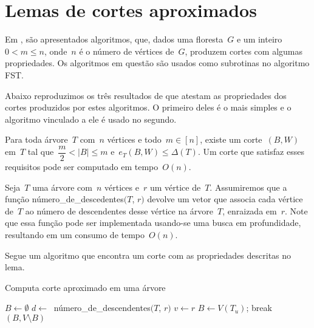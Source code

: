 \section {Lemas de cortes aproximados}

Em \cite{Schmidt15}, são apresentados 
algoritmos, que, dados uma floresta~$G$ e um 
inteiro~$0<m\le n$, onde~$n$ é o número de vértices de~$G$, 
produzem cortes com algumas propriedades.
Os algoritmos em questão são usados como subrotinas no algoritmo
FST.

Abaixo reproduzimos os três resultados de \cite{Schmidt15} que 
atestam as propriedades dos cortes produzidos por estes algoritmos.
O primeiro deles é o mais simples e o algoritmo vinculado a ele
é usado no segundo.

\bigskip

\begin{lem}[]
\label{lema:simpleApproxCutTree}
	Para toda árvore~$T$ com~$n$ vértices e todo~$m \in [n]$,
	existe um corte~$(B,W)$ em~$T$ tal 
	que~${\dfrac{m}{2} <|B| \le m}$ e~${e_T(B,W) \le \Delta(T)}$.
	Um corte que satisfaz esses requisitos pode ser computado em
	tempo~$O(n)$.
\end{lem}

\bigskip

Seja~$T$ uma árvore com~$n$ vértices e~$r$ um vértice de~$T$. 
Assumiremos que
a função {\sc número\_de\_descedentes}$(T$, $r)$ devolve um vetor
que associa cada vértice de~$T$ ao número de descendentes desse 
vértice na árvore~$T$, enraizada em~$r$. Note que essa função 
pode ser implementada usando-se uma busca em profundidade,
resultando em um consumo de tempo~$O(n)$.


Segue um algoritmo que encontra um corte com as propriedades 
descritas no lema.

\medskip

\begin{algorithm}[H]
\label{alg:simpleApproxCutTree}

	\caption{Computa corte aproximado em uma árvore}
	$B \gets \emptyset$\;
		$d \gets~$ {\sc número\_de\_descendentes}$(T$, $r)$\;
		$v \gets r$\;
		{
			$B\gets V(T_u)$; \quad
		}
		{
		{
			{
				break\;
			}
		}
		}
	\Return $(B,V\setminus B)$

\end{algorithm}	

